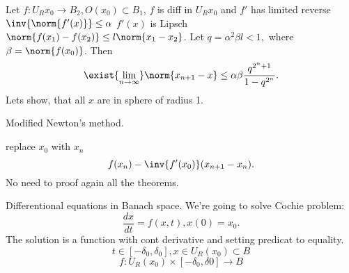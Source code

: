 

\theorem Let $f\colon U_R{x_0}\to B_2, O(x_0)\subset B_1$, $f$ is diff in $U_R{x_0}$ and $f'$ has limited reverse $\inv{\norm{f'(x)}} \le \alpha$
$f'(x)$ is Lipsch $\norm{f(x_1) - f(x_2)} \le l\norm{x_1-x_2}$. Let $q = \alpha^2\beta l < 1,$ where $\beta = \norm{f(x_0)}$. Then 
$$\exist{\lim_{n\to\infty}} \norm{x_{n+1} - x} \le \alpha\beta\frac{q^{2^n+1}}{1-q^{2^n}}.$$
Lets show, that all $x$ are in sphere of radius 1.

Modified Newton's method.

replace $x_0$ with $x_n$
$$f(x_n) - \inv{f'(x_0)}(x_{n+1} - x_n).$$
No need to proof again all the theorems.


Differentional equations in Banach space.
We're going to solve Cochie problem:
$$\frac{dx}{dt} = f(x,t), x(0) = x_0.$$
The solution is a function with cont derivative and setting predicat to equality.
$$t\in [-\delta_0, \delta_0], x\in U_R(x_0)\subset B$$
$$f\colon U_R(x_0)\times[-\delta_0, \delta 0] \to B$$


